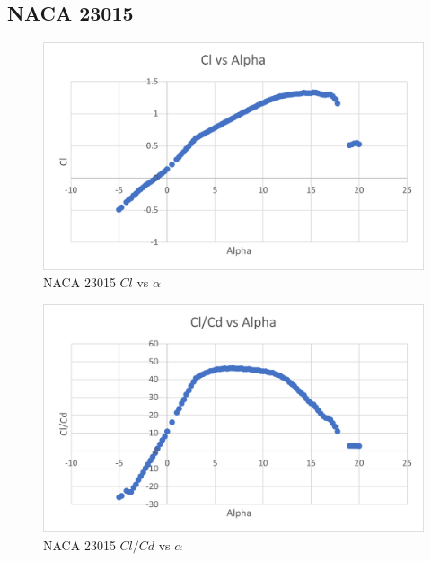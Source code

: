 \documentclass{article}
\begin{document}
\subsection{NACA 23015}
\begin{figure}[!h]
\begin{center}
	\includegraphics[scale=0.7]{NACA 23015 Clalpha.png}
	\caption{NACA 23015 $Cl$ vs $\alpha$}
	\label{Figure4:}
\end{center}
\end{figure}

\begin{figure}[!h]
\begin{center}
	\includegraphics[scale=0.7]{NACA 23015 Efficiencyalpha.png}
	\caption{NACA 23015 $Cl/Cd$ vs $\alpha$}
	\label{Figure5:}
\end{center}
\end{figure}
\end{document}
